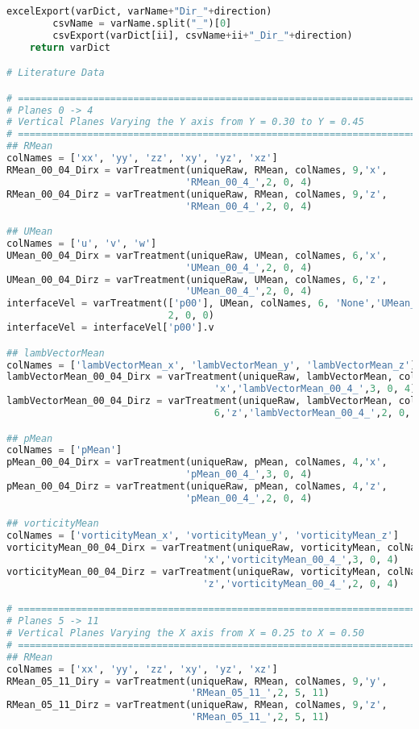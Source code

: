 \begin{lstlisting}[language=python]
        excelExport(varDict, varName+"Dir_"+direction)
        csvName = varName.split("_")[0]
        csvExport(varDict[ii], csvName+ii+"_Dir_"+direction)
    return varDict

# Literature Data

# =============================================================================
# Planes 0 -> 4
# Vertical Planes Varying the Y axis from Y = 0.30 to Y = 0.45
# =============================================================================
## RMean
colNames = ['xx', 'yy', 'zz', 'xy', 'yz', 'xz']
RMean_00_04_Dirx = varTreatment(uniqueRaw, RMean, colNames, 9,'x',
                               'RMean_00_4_',2, 0, 4)
RMean_00_04_Dirz = varTreatment(uniqueRaw, RMean, colNames, 9,'z',
                               'RMean_00_4_',2, 0, 4)

## UMean
colNames = ['u', 'v', 'w']
UMean_00_04_Dirx = varTreatment(uniqueRaw, UMean, colNames, 6,'x',
                               'UMean_00_4_',2, 0, 4)
UMean_00_04_Dirz = varTreatment(uniqueRaw, UMean, colNames, 6,'z',
                               'UMean_00_4_',2, 0, 4)
interfaceVel = varTreatment(['p00'], UMean, colNames, 6, 'None','UMean_p00_',
                            2, 0, 0)
interfaceVel = interfaceVel['p00'].v

## lambVectorMean
colNames = ['lambVectorMean_x', 'lambVectorMean_y', 'lambVectorMean_z']
lambVectorMean_00_04_Dirx = varTreatment(uniqueRaw, lambVectorMean, colNames, 6,
                                    'x','lambVectorMean_00_4_',3, 0, 4)
lambVectorMean_00_04_Dirz = varTreatment(uniqueRaw, lambVectorMean, colNames,
                                    6,'z','lambVectorMean_00_4_',2, 0, 4)

## pMean
colNames = ['pMean']
pMean_00_04_Dirx = varTreatment(uniqueRaw, pMean, colNames, 4,'x',
                               'pMean_00_4_',3, 0, 4)
pMean_00_04_Dirz = varTreatment(uniqueRaw, pMean, colNames, 4,'z',
                               'pMean_00_4_',2, 0, 4)

## vorticityMean
colNames = ['vorticityMean_x', 'vorticityMean_y', 'vorticityMean_z']
vorticityMean_00_04_Dirx = varTreatment(uniqueRaw, vorticityMean, colNames, 6,
                                  'x','vorticityMean_00_4_',3, 0, 4)
vorticityMean_00_04_Dirz = varTreatment(uniqueRaw, vorticityMean, colNames, 6,
                                  'z','vorticityMean_00_4_',2, 0, 4)

# =============================================================================
# Planes 5 -> 11
# Vertical Planes Varying the X axis from X = 0.25 to X = 0.50
# =============================================================================
## RMean
colNames = ['xx', 'yy', 'zz', 'xy', 'yz', 'xz']
RMean_05_11_Diry = varTreatment(uniqueRaw, RMean, colNames, 9,'y',
                                'RMean_05_11_',2, 5, 11)
RMean_05_11_Dirz = varTreatment(uniqueRaw, RMean, colNames, 9,'z',
                                'RMean_05_11_',2, 5, 11)


\end{lstlisting}
